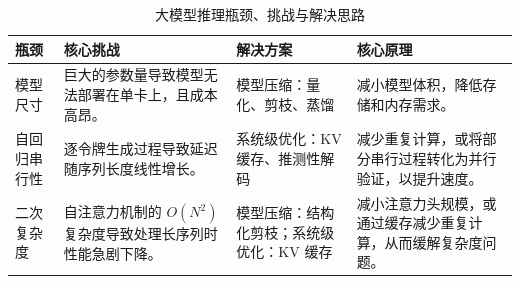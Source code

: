 \documentclass[../main.tex]{subfiles}
\begin{document}
\begin{table}[H]
    \centering
    \caption{大模型推理瓶颈、挑战与解决思路}
    \begin{tabular}{p{2.0cm}p{4.2cm}p{3.6cm}p{4.2cm}}
        \toprule
        瓶颈 & 核心挑战 & 解决方案 & 核心原理 \\
        \midrule
        模型尺寸 & 巨大的参数量导致模型无法部署在单卡上，且成本高昂。 & 模型压缩：量化、剪枝、蒸馏 & 减小模型体积，降低存储和内存需求。 \\
        
        自回归串行性 & 逐令牌生成过程导致延迟随序列长度线性增长。 & 系统级优化：KV 缓存、推测性解码 & 减少重复计算，或将部分串行过程转化为并行验证，以提升速度。 \\
        
        二次复杂度 & 自注意力机制的 $O(N^2)$ 复杂度导致处理长序列时性能急剧下降。 & 模型压缩：结构化剪枝；系统级优化：KV 缓存 & 减小注意力头规模，或通过缓存减少重复计算，从而缓解复杂度问题。 \\
        \bottomrule
    \end{tabular}
\end{table}
\end{document}
